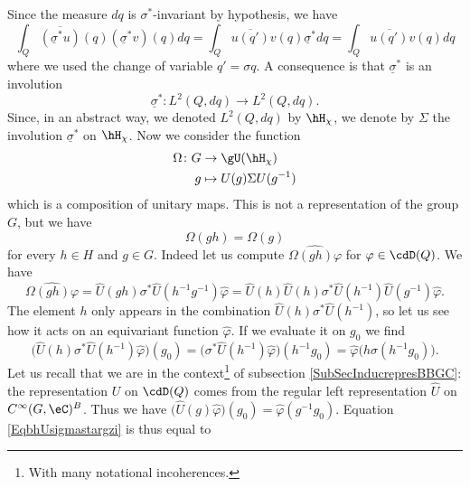 Since the measure $dq$ is $\sigma^*$-invariant by hypothesis, we have
\begin{equation}
	\int_Q\overline{ (\underline\sigma^*u) }(q)(\underline\sigma^*v)(q)dq=\int_Q\overline{ u(q') }v(q)\underline\sigma^*dq=\int_Q\overline{ u(q') }v(q)dq
\end{equation}
where we used the change of variable $q'=\sigma q$. A consequence is that $\underline\sigma^*$ is an involution
\begin{equation}
	\underline\sigma^*\colon L^2(Q,dq)\to L^2(Q,dq).
\end{equation}
Since, in an abstract way, we denoted $L^2(Q,dq)$ by $\hH_{\chi}$, we denote by $\Sigma$ the involution $\underline\sigma^*$ on $\hH_{\chi}$. Now we consider the function
\begin{equation}
	\begin{aligned}
		\Omega\colon G&\to \gU(\hH_{\chi}) \\
		g&\mapsto U(g)\Sigma U(g^{-1}) 
	\end{aligned}
\end{equation}
which is a composition of unitary maps. This is not a representation of the group $G$, but we have
\begin{equation}
	\Omega(gh)=\Omega(g)
\end{equation}
for every $h\in H$ and $g\in G$. Indeed let us compute $\widehat{\Omega(gh)\varphi}$ for $\varphi\in\cdD(Q)$. We have
\begin{equation}		\label{EqwOshvhvkl}
		\widehat{\Omega(gh)\varphi}=\hat U(gh)\sigma^*\hat U(h^{-1}g^{-1})\hat\varphi
		=\hat U(h)\hat U(h)\sigma^*\hat U(h^{-1})\hat U(g^{-1})\hat\varphi.
\end{equation}
The element $h$ only appears in the combination $\hat U(h)\sigma^*\hat U(h^{-1})$, so let us see how it acts on an equivariant function $\hat \varphi$. If we evaluate it on $g_0$ we find
\begin{equation}		\label{EqbhUsigmastargzi}
		\big( \hat U(h)\sigma^*\hat U(h^{-1})\hat\varphi \big)(g_0)=\big( \sigma^*\hat U(h^{-1})\hat\varphi \big)(h^{-1}g_0)
		=\hat\varphi\big( h\sigma(h^{-1}g_0) \big).
\end{equation}
Let us recall that we are in the context\footnote{With many notational incoherences.} of subsection \ref{SubSecInducrepresBBGC}: the representation $U$ on $\cdD(Q)$ comes from the regular left representation $\hat U$ on $ C^{\infty}(G,\eC)^B$. Thus we have $\big( \hat U(g)\hat\varphi \big)(g_0)=\hat\varphi(g^{-1}g_0)$. Equation \eqref{EqbhUsigmastargzi} is thus equal to
